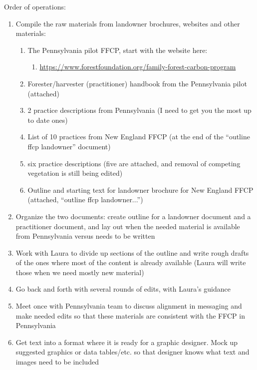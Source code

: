 \documentclass{article}\usepackage[]{graphicx}\usepackage[]{color}
\begin{document}
Order of operations:
\begin{enumerate}
\item Compile the raw materials from landowner brochures, websites and other materials:
  \begin{enumerate}
  \item The Pennsylvania pilot FFCP, start with the website here: 
    \begin{enumerate}
    \item \url{https://www.forestfoundation.org/family-forest-carbon-program}
    \end{enumerate}
  \item Forester/harvester (practitioner) handbook from the Pennsylvania pilot (attached)
  \item 2 practice descriptions from Pennsylvania (I need to get you the most up to date ones) 
  \item List of 10 practices from New England FFCP (at the end of the ``outline ffcp landowner'' document) 
  \item six practice descriptions (five are attached, and removal of competing vegetation is still being edited)
  \item Outline and starting text for landowner brochure for New England FFCP (attached, ``outline ffcp landowner...'')
  \end{enumerate}
\item Organize the two documents: create outline for a landowner document and a practitioner document, and lay out when the needed material is available from Pennsylvania versus needs to be written
\item Work with Laura to divide up sections of the outline and write rough drafts of the ones where most of the content is already available (Laura will write those when we need mostly new material)
\item Go back and forth with several rounds of edits, with Laura's guidance
\item Meet once with Pennsylvania team to discuss alignment in messaging and make needed edits so that these materials are consistent with the FFCP in Pennsylvania
\item Get text into a format where it is ready for a graphic designer. Mock up suggested graphics or data tables/etc. so that designer knows what text and images need to be included
\end{enumerate}
\end{document}
